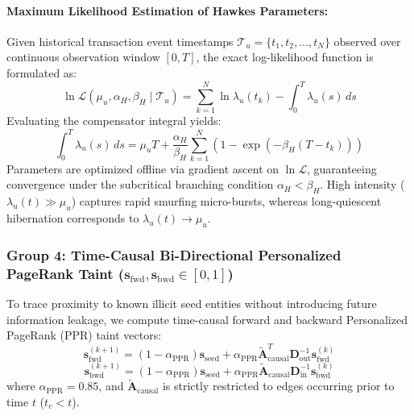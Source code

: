 \paragraph{Maximum Likelihood Estimation of Hawkes Parameters:}
Given historical transaction event timestamps $\mathcal{T}_u = \{t_1, t_2, \dots, t_N\}$ observed over continuous observation window $[0, T]$, the exact log-likelihood function is formulated as:
\begin{equation}
\ln \mathcal{L}(\mu_u, \alpha_H, \beta_H \mid \mathcal{T}_u) = \sum_{k=1}^N \ln \lambda_u(t_k) - \int_0^T \lambda_u(s) \, ds
\end{equation}
Evaluating the compensator integral yields:
\begin{equation}
\int_0^T \lambda_u(s) \, ds = \mu_u T + \frac{\alpha_H}{\beta_H} \sum_{k=1}^N \left( 1 - \exp(-\beta_H (T - t_k)) \right)
\end{equation}
Parameters are optimized offline via gradient ascent on $\ln \mathcal{L}$, guaranteeing convergence under the subcritical branching condition $\alpha_H < \beta_H$. High intensity ($\lambda_u(t) \gg \mu_u$) captures rapid smurfing micro-bursts, whereas long-quiescent hibernation corresponds to $\lambda_u(t) \to \mu_u$.

\subsubsection{Group 4: Time-Causal Bi-Directional Personalized PageRank Taint ($\mathbf{s}_{\text{fwd}}, \mathbf{s}_{\text{bwd}} \in [0, 1]$)}
To trace proximity to known illicit seed entities without introducing future information leakage, we compute time-causal forward and backward Personalized PageRank (PPR) taint vectors:
\begin{equation}
\mathbf{s}_{\text{fwd}}^{(k+1)} = (1 - \alpha_{\text{PPR}}) \mathbf{s}_{\text{seed}} + \alpha_{\text{PPR}} \mathbf{\tilde{A}}_{\text{causal}}^T \mathbf{D}_{\text{out}}^{-1} \mathbf{s}_{\text{fwd}}^{(k)}
\end{equation}
\begin{equation}
\mathbf{s}_{\text{bwd}}^{(k+1)} = (1 - \alpha_{\text{PPR}}) \mathbf{s}_{\text{seed}} + \alpha_{\text{PPR}} \mathbf{\tilde{A}}_{\text{causal}} \mathbf{D}_{\text{in}}^{-1} \mathbf{s}_{\text{bwd}}^{(k)}
\end{equation}
where $\alpha_{\text{PPR}} = 0.85$, and $\mathbf{\tilde{A}}_{\text{causal}}$ is strictly restricted to edges occurring prior to time $t$ ($t_e < t$).

